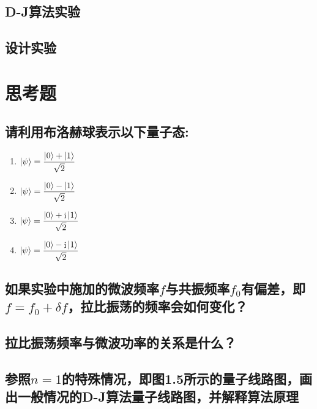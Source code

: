 \documentclass[a4paper]{article}
\DeclareMathOperator{\I}{\mathrm{i}}
\begin{document}
\subsection{D-J算法实验}
\subsection{设计实验}






\section{思考题}
\subsection*{请利用布洛赫球表示以下量子态:}
\begin{enumerate}
	\item $ \ket{\psi} = \dfrac{\ket{0} + \ket{1}}{\sqrt{2}} $
	\item $ \ket{\psi} = \dfrac{\ket{0} - \ket{1}}{\sqrt{2}} $
	\item $ \ket{\psi} = \dfrac{\ket{0} + \I\ket{1}}{\sqrt{2}} $
	\item $ \ket{\psi} = \dfrac{\ket{0} - \I\ket{1}}{\sqrt{2}} $
\end{enumerate}

\subsection*{如果实验中施加的微波频率$ f $与共振频率$ f_0 $有偏差，即$ f = f_0 + \delta f $，拉比振荡的频率会如何变化？}

\subsection*{拉比振荡频率与微波功率的关系是什么？}

\subsection*{参照$ n=1 $的特殊情况，即图1.5所示的量子线路图，画出一般情况的D-J算法量子线路图，并解释算法原理}



\end{document}
